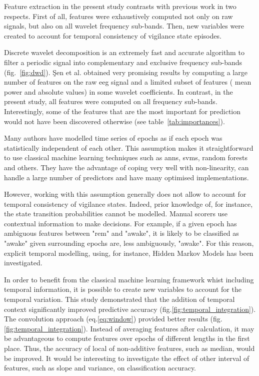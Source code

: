 Feature extraction in the present study contrasts with previous work in two respects.
First of all, features were exhaustively computed not only on raw signals,
but also on all wavelet frequency sub-bands.
Then, new variables were created to account for temporal consistency of vigilance state episodes.

Discrete wavelet decomposition is an extremely fast and accurate algorithm to filter a periodic
signal into complementary and exclusive frequency sub-bands (fig.~\ref{fig:dwd}).
\c{S}en et al.\cite{sen_comparative_2014} obtained very promising results by
computing a large number of features on the raw \gls{eeg} signal and a limited subset of features (\ie{} mean power and absolute values) in some wavelet coefficients.
In contrast, in the present study, all features were computed on all frequency sub-bands.
Interestingly, some of the features that are the most important for prediction would not have
been discovered otherwise (see table~\ref{tab:importances}).



Many authors have modelled time series of epochs as if each epoch was statistically independent of each other.
This assumption makes it straightforward to use classical machine learning techniques such as
\glspl{ann}, \glspl{svm}\cite{crisler_sleep-stage_2008},
random forests\cite{breiman_random_2001} and others.
They have the advantage of coping very well with non-linearity, can handle a large number of predictors and have many optimised implementations.

However, working with this assumption generally does not allow to account for temporal consistency of vigilance states.
Indeed, prior knowledge of, for instance, the state transition probabilities cannot be modelled.
Manual scorers use contextual information to make decisions.
For example, if a given epoch has ambiguous features between "\gls{rem}" and "awake",
it is likely to be classified as "awake" given surrounding epochs are, less ambiguously, "awake".
For this reason, explicit temporal modelling, using, for instance, Hidden Markov Models has been investigated\cite{doroshenkov_classification_2007,pan_transition-constrained_2012}.

In order to benefit from the classical machine learning
framework whist including temporal information,
it is possible to create new variables to account for the temporal
variation\cite{dietterich_machine_2002}.
This study demonstrated that the addition of temporal context significantly improved predictive accuracy (fig.\ref{fig:temporal_integration}).
The convolution approach (eq.\ref{eq:window}) provided better results (fig.\ref{fig:temporal_integration}). 
Instead of averaging features after calculation, it may be advantageous to compute features over epochs of different lengths in the first place.
Thus, the accuracy of local of non-additive features, such as median, would be improved.
It would be interesting to investigate the effect of other interval of features, such as slope and variance\cite{deng_time_2013},
on classification accuracy.

